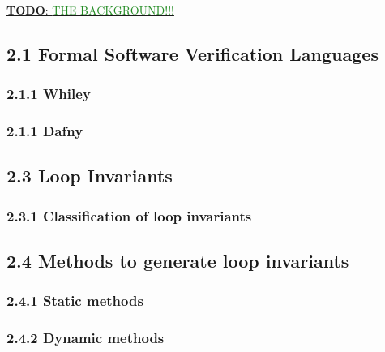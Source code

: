 \documentclass[11pt, a4paper, twoside, openright]{report}
\newcommand{\todo}[1]{\huge{\underline{\textbf{\textcolor{RubineRed}{TODO}}: \textcolor{ForestGreen}{#1}}}\normalsize }
\begin{document}
\todo{THE BACKGROUND!!!}

\subsection*{2.1 Formal Software Verification Languages}

\subsubsection*{2.1.1 Whiley}
\cite{whiley-origin} \cite{whiley-design}

\subsubsection*{2.1.1 Dafny}
\cite{dafny-started}


\subsection*{2.3 Loop Invariants}
%

\subsubsection*{2.3.1 Classification of loop invariants}

\subsection*{2.4 Methods to generate loop invariants}

\subsubsection*{2.4.1 Static methods}

\subsubsection*{2.4.2 Dynamic methods}
\end{document}
